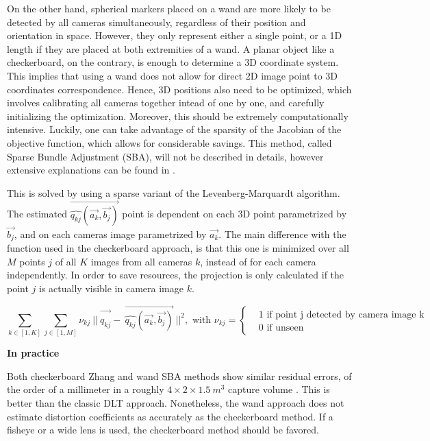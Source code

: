 On the other hand, spherical markers placed on a wand are more likely to be detected by all cameras simultaneously, regardless of their position and orientation in space. However, they only represent either a single point, or a 1D length if they are placed at both extremities of a wand. A planar object like a checkerboard, on the contrary, is enough to determine a 3D coordinate system. This implies that using a wand does not allow for direct 2D image point to 3D coordinates correspondence. Hence, 3D positions also need to be optimized, which involves calibrating all cameras together intead of one by one, and carefully initializing the optimization. Moreover, this should be extremely computationally intensive. Luckily, one can take advantage of the sparsity of the Jacobian of the objective function, which allows for considerable savings. This method, called Sparse Bundle Adjustment (SBA), will not be described in details, however extensive explanations can be found in \cite{Lourakis2009}.

This is solved by using a sparse variant of the Levenberg-Marquardt algorithm.  The estimated $\overrightarrow{\widehat{q_{kj}}(\overrightarrow{a_k}, \overrightarrow{b_j})}$ point is dependent on each 3D point parametrized by $\overrightarrow{b_j}$, and on each cameras image parametrized by $\overrightarrow{a_k}$. The main difference with the function used in the checkerboard approach, is that this one is minimized over all $M$ points $j$ of all $K$ images from all cameras $k$, instead of for each camera independently. In order to save resources, the projection is only calculated if the point $j$ is actually visible in camera image $k$.

\begin{equation}
  \sum_{k \in [1,K]} \sum_{j \in [1,M]} 
  \nu_{kj} \ ||\ \overrightarrow{q_{kj}^{\ ^{\ ^{\ ^{\ }}}}} - \ 
  \overrightarrow{\widehat{q_{kj}}(\overrightarrow{a_k}, \overrightarrow{b_j})}\ 
  ||^2,  
  \textrm{ with }  
  \nu_{kj} = 
    \begin{cases}
        & 1 \textrm{ if point j detected by camera image k} \\
        & 0 \textrm{ if unseen}
    \end{cases}
\end{equation} 


\vspace*{0.5cm}
\noindent\textbf{In practice}  

Both checkerboard Zhang and wand SBA methods show similar residual errors, of the order of a millimeter in a roughly $4\times 2 \times 1.5\ m^3$ capture volume \cite{Pribanic2009,Silvatti2012}. This is better than the classic DLT approach. Nonetheless, the wand approach does not estimate distortion coefficients as accurately as the checkerboard method. If a fisheye or a wide lens is used, the checkerboard method should be favored.

